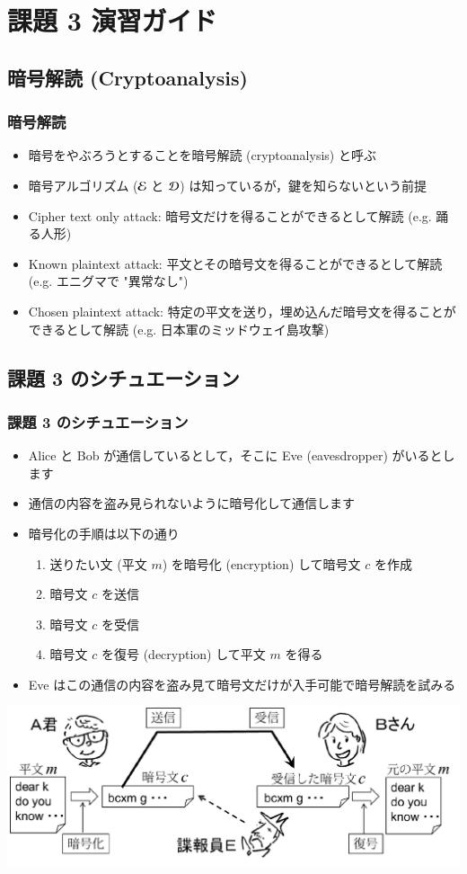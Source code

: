\section{課題 3 演習ガイド}
%
%
\subsection{暗号解読 (Cryptoanalysis)}
\begin{frame}
\frametitle{暗号解読}
  \begin{itemize}
\item 暗号をやぶろうとすることを暗号解読 (cryptoanalysis) と呼ぶ
\item 暗号アルゴリズム (\(\cal E\) と \(\cal D\)) は知っているが，鍵を知らないという前提
\item Cipher text only attack: 暗号文だけを得ることができるとして解読 (e.g. 踊る人形)
\item Known plaintext attack: 平文とその暗号文を得ることができるとして解読 (e.g. エニグマで "異常なし")
\item Chosen plaintext attack: 特定の平文を送り，埋め込んだ暗号文を得ることができるとして解読 (e.g. 日本軍のミッドウェイ島攻撃)
  \end{itemize}
\end{frame}
\subsection{課題 3 のシチュエーション}
\begin{frame}[containsverbatim,label=situation,shrink]
\frametitle{課題 3 のシチュエーション}
  \begin{itemize}
\item Alice と Bob が通信しているとして，そこに Eve (eavesdropper) がいるとします
\item 通信の内容を盗み見られないように暗号化して通信します
\item 暗号化の手順は以下の通り
    \begin{enumerate}
\item 送りたい文 (平文 $m$) を暗号化 (encryption) して暗号文 $c$ を作成
\item 暗号文 $c$ を送信
\item 暗号文 $c$ を受信
\item 暗号文 $c$ を復号 (decryption) して平文 $m$ を得る
    \end{enumerate}
\item Eve はこの通信の内容を盗み見て暗号文だけが入手可能で暗号解読を試みる
  \end{itemize}
  \begin{center}
\includegraphics[scale=0.3]{./Figure/elementaryCS-figAliceBob.pdf}
  \end{center}
\end{frame}
